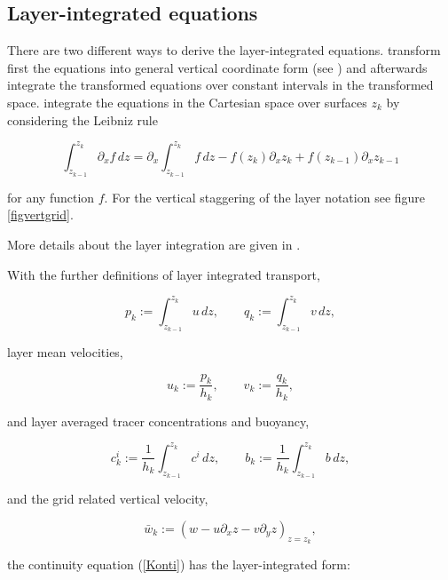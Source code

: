 \subsection{Layer-integrated equations}\label{SectionLayerIntegrated} 

There are two different ways to derive the layer-integrated
equations. \cite{BURCHARDea97} transform first the
equations into general vertical coordinate form
(see \cite{DELEERSNIJDERea92})
and afterwards
integrate the transformed equations over constant intervals in
the transformed space. \cite{LANDERea94} integrate the
equations in the Cartesian space over surfaces $z_k$ by
considering the Leibniz rule

\begin{equation}\label{Leibniz}
\int_{z_{k-1}}^{z_k}\partial_x f\,dz
=
\partial_x\int_{z_{k-1}}^{z_k} f\,dz
-f(z_k)\partial_xz_k
+f(z_{k-1})\partial_xz_{k-1}
\end{equation}

for any function $f$.
For the vertical staggering of the layer notation see figure
\ref{figvertgrid}.

More details about the layer integration are given in
\cite{BURCHARDea97}.

With the further definitions of layer integrated transport,

\begin{equation}\label{pqdef} 
p_k:=\int_{z_{k-1}}^{z_k}u\,dz,\qquad
q_k:=\int_{z_{k-1}}^{z_k}v\,dz,
\end{equation}

layer mean velocities,

\begin{equation}\label{ukvkdef} 
u_k:=\frac{p_k}{h_k},\qquad v_k:=\frac{q_k}{h_k},
\end{equation}

and layer averaged tracer concentrations and buoyancy,

\begin{equation}\label{ckbkdef} 
c^i_k:=\frac{1}{h_k}\int_{z_{k-1}}^{z_k}c^i\,dz,\qquad
b_k:=\frac{1}{h_k}\int_{z_{k-1}}^{z_k}b\,dz,
\end{equation}

and the grid related vertical velocity,

\begin{equation}\label{barwdef} 
\bar w_k:=(w-u\partial_xz-v\partial_yz)_{z=z_k},
\end{equation}

the continuity equation (\ref{Konti}) has the layer-integrated form:

